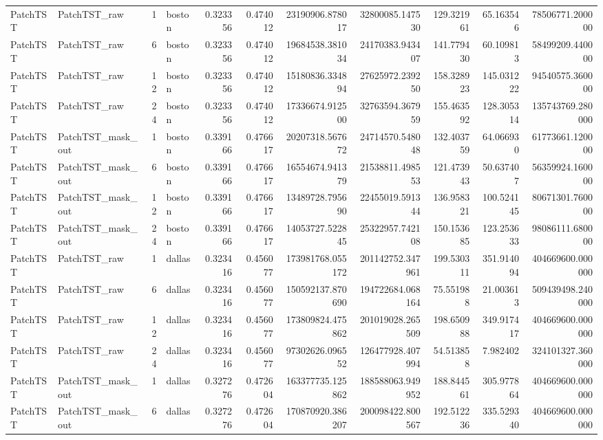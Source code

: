 \begin{longtable}{llrlrrrrrrr}
PatchTST & PatchTST\_raw & 1 & boston & 0.323356 & 0.474012 & 23190906.878017 & 32800085.147530 & 129.321961 & 65.163546 & 78506771.200000 \\
PatchTST & PatchTST\_raw & 6 & boston & 0.323356 & 0.474012 & 19684538.381034 & 24170383.943407 & 141.779430 & 60.109813 & 58499209.440000 \\
PatchTST & PatchTST\_raw & 12 & boston & 0.323356 & 0.474012 & 15180836.334894 & 27625972.239250 & 158.328923 & 145.031222 & 94540575.360000 \\
PatchTST & PatchTST\_raw & 24 & boston & 0.323356 & 0.474012 & 17336674.912500 & 32763594.367959 & 155.463592 & 128.305314 & 135743769.280000 \\
PatchTST & PatchTST\_mask\_out & 1 & boston & 0.339166 & 0.476617 & 20207318.567672 & 24714570.548048 & 132.403759 & 64.066930 & 61773661.120000 \\
PatchTST & PatchTST\_mask\_out & 6 & boston & 0.339166 & 0.476617 & 16554674.941379 & 21538811.498553 & 121.473943 & 50.637407 & 56359924.160000 \\
PatchTST & PatchTST\_mask\_out & 12 & boston & 0.339166 & 0.476617 & 13489728.795690 & 22455019.591344 & 136.958321 & 100.524145 & 80671301.760000 \\
PatchTST & PatchTST\_mask\_out & 24 & boston & 0.339166 & 0.476617 & 14053727.522845 & 25322957.742108 & 150.153685 & 123.253633 & 98086111.680000 \\
PatchTST & PatchTST\_raw & 1 & dallas & 0.323416 & 0.456077 & 173981768.055172 & 201142752.347961 & 199.530311 & 351.914094 & 404669600.000000 \\
PatchTST & PatchTST\_raw & 6 & dallas & 0.323416 & 0.456077 & 150592137.870690 & 194722684.068164 & 75.551988 & 21.003613 & 509439498.240000 \\
PatchTST & PatchTST\_raw & 12 & dallas & 0.323416 & 0.456077 & 173809824.475862 & 201019028.265509 & 198.650988 & 349.917417 & 404669600.000000 \\
PatchTST & PatchTST\_raw & 24 & dallas & 0.323416 & 0.456077 & 97302626.096552 & 126477928.407994 & 54.513858 & 7.982402 & 324101327.360000 \\
PatchTST & PatchTST\_mask\_out & 1 & dallas & 0.327276 & 0.472604 & 163377735.125862 & 188588063.949952 & 188.844561 & 305.977864 & 404669600.000000 \\
PatchTST & PatchTST\_mask\_out & 6 & dallas & 0.327276 & 0.472604 & 170870920.386207 & 200098422.800567 & 192.512236 & 335.529340 & 404669600.000000 \\

\end{longtable}
